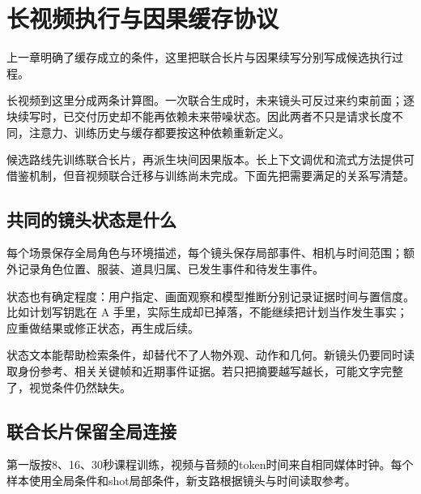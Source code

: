 \chapter{长视频执行与因果缓存协议}\label{seedance-m24}

上一章明确了缓存成立的条件，这里把联合长片与因果续写分别写成候选执行过程。

长视频到这里分成两条计算图。一次联合生成时，未来镜头可反过来约束前面；逐块续写时，已交付历史却不能再依赖未来带噪状态。因此两者不只是请求长度不同，注意力、训练历史与缓存都要按这种依赖重新定义。

候选路线先训练联合长片，再派生块间因果版本。长上下文调优和流式方法提供可借鉴机制，但音视频联合迁移与训练尚未完成。下面先把需要满足的关系写清楚。

\section{共同的镜头状态是什么}\label{seedance-m24-ux5171ux540cux7684ux955cux5934ux72b6ux6001ux662fux4ec0ux4e48}

每个场景保存全局角色与环境描述，每个镜头保存局部事件、相机与时间范围；额外记录角色位置、服装、道具归属、已发生事件和待发生事件。

状态也有确定程度：用户指定、画面观察和模型推断分别记录证据时间与置信度。比如计划写钥匙在 A 手里，实际生成却已掉落，不能继续把计划当作发生事实；应重做结果或修正状态，再生成后续。

状态文本能帮助检索条件，却替代不了人物外观、动作和几何。新镜头仍要同时读取身份参考、相关关键帧和近期事件证据。若只把摘要越写越长，可能文字完整了，视觉条件仍然缺失。

\section{联合长片保留全局连接}\label{seedance-m24-ux8054ux5408ux957fux7247ux4fddux7559ux5168ux5c40ux8fdeux63a5}

第一版按8、16、30秒课程训练，视频与音频的token时间来自相同媒体时钟。每个样本使用全局条件和shot局部条件，新支路根据镜头与时间读取参考。

